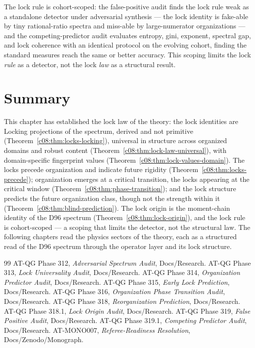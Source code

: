 The lock rule is cohort-scoped: the false-positive audit \cite{c08:QG319} finds the lock
rule weak as a standalone detector under adversarial synthesis --- the lock identity is
fake-able by tiny rational-ratio spectra and miss-able by large-numerator organizations ---
and the competing-predictor audit \cite{c08:QG319.1} evaluates entropy, gini, exponent,
spectral gap, and lock coherence with an identical protocol on the evolving cohort, finding
the standard measures reach the same or better accuracy. This scoping limits the lock
\emph{rule} as a detector, not the lock \emph{law} as a structural result.

\section{Summary}
\label{c08:sec:locks-summary}

This chapter has established the lock law of the theory: the lock identities are Locking
projections of the spectrum, derived and not primitive (Theorem~\ref{c08:thm:locks-locking}),
universal in structure across organized domains and robust content
(Theorem~\ref{c08:thm:lock-law-universal}), with domain-specific fingerprint values
(Theorem~\ref{c08:thm:lock-values-domain}). The locks precede organization and indicate
future rigidity (Theorem~\ref{c08:thm:locks-precede}); organization emerges at a critical
transition, the locks appearing at the critical window (Theorem~\ref{c08:thm:phase-transition});
and the lock structure predicts the future organization class, though not the strength
within it (Theorem~\ref{c08:thm:blind-prediction}). The lock origin is the moment-chain
identity of the D96 spectrum (Theorem~\ref{c08:thm:lock-origin}), and the lock rule is
cohort-scoped --- a scoping that limits the detector, not the structural law. The following
chapters read the physics sectors of the theory, each as a structured read of the D96
spectrum through the operator layer and its lock structure.

\begin{thebibliography}{99}
 AT-QG Phase 312, \emph{Adversarial Spectrum Audit}, Docs/Research.
 AT-QG Phase 313, \emph{Lock Universality Audit}, Docs/Research.
 AT-QG Phase 314, \emph{Organization Predictor Audit}, Docs/Research.
 AT-QG Phase 315, \emph{Early Lock Prediction}, Docs/Research.
 AT-QG Phase 316, \emph{Organization Phase Transition Audit}, Docs/Research.
 AT-QG Phase 318, \emph{Reorganization Prediction}, Docs/Research.
 AT-QG Phase 318.1, \emph{Lock Origin Audit}, Docs/Research.
 AT-QG Phase 319, \emph{False Positive Audit}, Docs/Research.
 AT-QG Phase 319.1, \emph{Competing Predictor Audit}, Docs/Research.
 AT-MONO007, \emph{Referee-Readiness Resolution}, Docs/Zenodo/Monograph.
\end{thebibliography}
